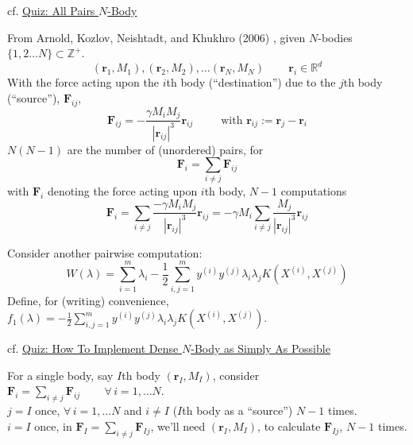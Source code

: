 \documentclass[10pt]{amsart}
\begin{document}
\begin{multicols*}{2}
cf. \href{https://classroom.udacity.com/courses/cs344/lessons/116611037/concepts/1198442170923#}{Quiz: All Pairs $N$-Body}

From Arnold, Kozlov, Neishtadt, and Khukhro (2006) \cite{AKNK2006}, given $N$-bodies $\lbrace 1,2 \dots N\rbrace \subset \mathbb{Z}^+$.
\[
(\mathbf{r}_1, M_1), (\mathbf{r}_2, M_2), \dots (\mathbf{r}_N, M_N) \qquad \, \mathbf{r}_i \in \mathbb{R}^d
\]
With the force acting upon the $i$th body (``destination'') due to the $j$th body (``source''), $\mathbf{F}_{ij}$,
\begin{equation}
  \mathbf{F}_{ij} = - \frac{\gamma M_i M_j}{ |\mathbf{r}_{ij} |^3 } \mathbf{r}_{ij} \qquad \, \text{ with } \mathbf{r}_{ij} := \mathbf{r}_j - \mathbf{r}_i
\end{equation}
$N(N-1)$ are the number of (unordered) pairs, for
\begin{equation}
\mathbf{F}_i = \sum_{i\neq j} \mathbf{F}_{ij}
\end{equation}
with $\mathbf{F}_i$ denoting the force acting upon $i$th body, $N-1$ computations
\begin{equation}
\mathbf{F}_i =\sum_{i\neq j} \frac{- \gamma M_i M_j }{ |\mathbf{r}_{ij} |^3 } \mathbf{r}_{ij} = -\gamma M_i \sum_{i\neq j} \frac{ M_j}{ |\mathbf{r}_{ij} |^3 } \mathbf{r}_{ij}
\end{equation}

Consider another pairwise computation:
\begin{equation}
  W(\lambda) = \sum_{i=1}^m \lambda_i - \frac{1}{2} \sum_{i,j=1}^m y^{(i)} y^{(j)} \lambda_i\lambda_j K(X^{(i)}, X^{(j)})
\end{equation}
Define, for (writing) convenience,$f_1(\lambda) = -\frac{1}{2} \sum_{i,j=1}^m y^{(i)} y^{(j)} \lambda_i\lambda_j K(X^{(i)}, X^{(j)})$.  









cf. \href{https://classroom.udacity.com/courses/cs344/lessons/116611037/concepts/1198442170923#}{Quiz: How To Implement Dense $N$-Body as Simply As Possible}

For a single body, say $I$th body $(\mathbf{r}_I, M_I)$, consider $\mathbf{F}_i =\sum_{i\neq j} \mathbf{F}_{ij} \qquad \, \forall \, i = 1, \dots N$.  \\
$j=I$ once, $\forall \, i = 1, \dots N$ and $i\neq I$ ($I$th body as a ``source'') $N-1$ times.  \\
$i=I$ once, in $\mathbf{F}_I=\sum_{i\neq j} \mathbf{F}_{Ij}$, we'll need $(\mathbf{r}_I, M_I)$, to calculate $\mathbf{F}_{Ij}$, $N-1$ times.


\end{multicols*}
\end{document}
